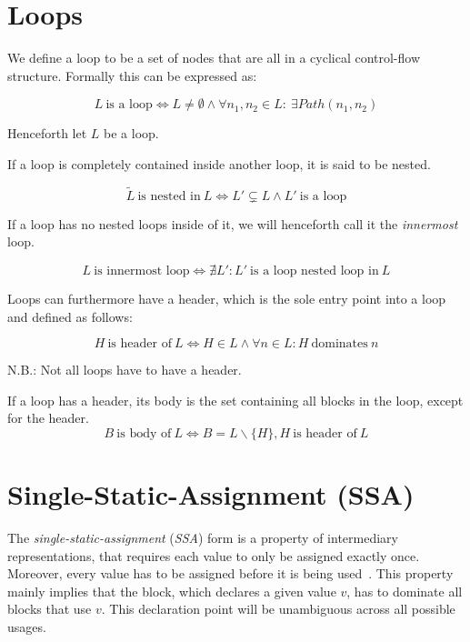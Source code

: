 
\section{Loops}\label{sec:basics:loops}

We define a loop to be a set of nodes that are all in a cyclical control-flow structure.
Formally this can be expressed as:

$$L~\text{is a loop} \Longleftrightarrow L \neq \emptyset \wedge \forall n_1, n_2 \in L:~\exists Path(n_1, n_2)$$

Henceforth let $L$ be a loop.

If a loop is completely contained inside another loop, it is said to be nested.

$$\tilde{L}~\text{is nested in}~L \Longleftrightarrow L' \subsetneq L \wedge L'~\text{is a loop}$$

If a loop has no nested loops inside of it, we will henceforth call it the \textit{innermost} loop.

$$L~\text{is innermost loop} \Longleftrightarrow \nexists L': L'~\text{is a loop nested loop in}~L$$

Loops can furthermore have a header, which is the sole entry point into a loop~\cite{aebi18bachelorarbeit} and defined as follows:

$$H~\text{is header of}~L \Longleftrightarrow H \in L \wedge \forall n \in L: H~\text{dominates}~n$$

N.B.: Not all loops have to have a header.

If a loop has a header, its body is the set containing all blocks in the loop, except for the header.
$$B~\text{is body of}~L \Longleftrightarrow B = L \backslash \{H\}, H~\text{is header of}~L$$

\section{Single-Static-Assignment (SSA)}\label{sec:basics:ssa}

The \textit{single-static-assignment} (\textit{SSA}) form is a property of intermediary representations, that requires each value to only be assigned exactly once.
Moreover, every value has to be assigned before it is being used~\cite{cytron91}.
This property mainly implies that the block, which declares a given value $v$, has to dominate all blocks that use $v$.
This declaration point will be unambiguous across all possible usages.


